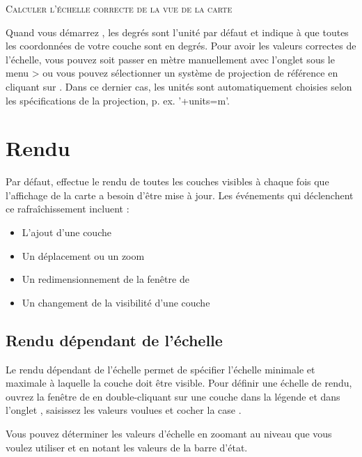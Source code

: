 \begin{Tip}\caption{\textsc{Calculer l'échelle correcte de la vue de la carte}}
Quand vous démarrez \qg, les degrés sont l'unité par défaut et indique à \qg que toutes les coordonnées de votre couche sont en degrés. Pour avoir les valeurs correctes de l'échelle, vous pouvez soit passer en mètre manuellement avec l'onglet  sous le menu  > ou vous pouvez sélectionner un système de projection de référence en cliquant sur . Dans ce dernier cas, les unités sont automatiquement choisies selon les spécifications de la projection, p. ex. '+units=m'.
\end{Tip}

\section{Rendu}\label{subsec:redraw_events}

Par défaut, \qg effectue le rendu de toutes les couches visibles à chaque fois que l'affichage de la carte a besoin d'être mise à jour. Les événements qui déclenchent ce rafraîchissement incluent :

\begin{itemize}[label=--]
\item L'ajout d'une couche
\item Un déplacement ou un zoom
\item Un redimensionnement de la fenêtre de \qg
\item Un changement de la visibilité d'une couche
\end{itemize}

\subsection{Rendu dépendant de l'échelle}
\label{label_scaledepend}

Le rendu dépendant de l'échelle permet de spécifier l'échelle minimale et maximale à laquelle la couche doit être visible. Pour définir une échelle de rendu, ouvrez la fenêtre de  en double-cliquant sur une couche dans la légende et dans l'onglet , saisissez les valeurs voulues et cocher la case .

Vous pouvez déterminer les valeurs d'échelle en zoomant au niveau que vous voulez utiliser et en notant les valeurs de la barre d'état.

